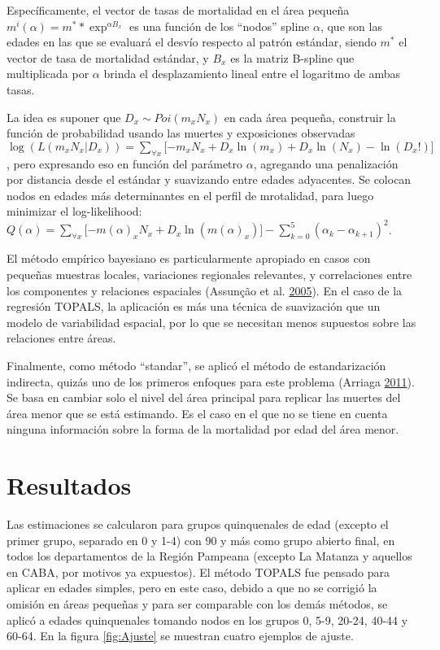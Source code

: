 \documentclass[12pt,]{article}
\begin{document}
Específicamente, el vector de tasas de mortalidad en el área pequeña
\(m^{i}(\alpha) = m^{*}*\exp^{\alpha B_{x}}\) es una función de los
``nodos'' spline \(\alpha\), que son las edades en las que se evaluará
el desvío respecto al patrón estándar, siendo \(m^*\) el vector de tasa
de mortalidad estándar, y \(B_{x}\) es la matriz B-spline que
multiplicada por \(\alpha\) brinda el desplazamiento lineal entre el
logaritmo de ambas tasas.

La idea es suponer que \(D_{x}\sim Poi (m_ {x} N_ {x})\) en cada área
pequeña, construir la función de probabilidad usando las muertes y
exposiciones observadas
\(\log(L(m_{x}N_{x}|D_{x}))=\sum_{\forall x}{\lbrack -m_{x}N_{x}+D_{x}\ln (m_{x})+D_{x}\ln (N_{x})-\ln (D_{x}!)\rbrack}\),
pero expresando eso en función del parámetro \(\alpha\), agregando una
penalización por distancia desde el estándar y suavizando entre edades
adyacentes. Se colocan nodos en edades más determinantes en el perfil de
mrotalidad, para luego minimizar el log-likelihood:
\(Q(\alpha )=\sum_{\forall x}{\lbrack -m(\alpha )_{x}N_{x}+D_{x}\ln(m(\alpha )_{x})\rbrack }-\sum_{k=0}^{5}{(\alpha _{k}-\alpha _{k+1})^{2}}\).

El método empírico bayesiano es particularmente apropiado en casos con
pequeñas muestras locales, variaciones regionales relevantes, y
correlaciones entre los componentes y relaciones espaciales (Assunção et
al. \protect\hyperlink{ref-Assuncao2005}{2005}). En el caso de la
regresión TOPALS, la aplicación es más una técnica de suavización que un
modelo de variabilidad espacial, por lo que se necesitan menos supuestos
sobre las relaciones entre áreas.

Finalmente, como método ``standar'', se aplicó el método de
estandarización indirecta, quizás uno de los primeros enfoques para este
problema (Arriaga \protect\hyperlink{ref-Arriaga2011}{2011}). Se basa en
cambiar solo el nivel del área principal para replicar las muertes del
área menor que se está estimando. Es el caso en el que no se tiene en
cuenta ninguna información sobre la forma de la mortalidad por edad del
área menor.

\hypertarget{resultados}{%
\section{Resultados}\label{resultados}}

Las estimaciones se calcularon para grupos quinquenales de edad (excepto
el primer grupo, separado en 0 y 1-4) con 90 y más como grupo abierto
final, en todos los departamentos de la Región Pampeana (excepto La
Matanza y aquellos en CABA, por motivos ya expuestos). El método TOPALS
fue pensado para aplicar en edades simples, pero en este caso, debido a
que no se corrigió la omisión en áreas pequeñas y para ser comparable
con los demás métodos, se aplicó a edades quinquenales tomando nodos en
los grupos 0, 5-9, 20-24, 40-44 y 60-64. En la figura \ref{fig:Ajuste}
se muestran cuatro ejemplos de ajuste.
\end{document}
